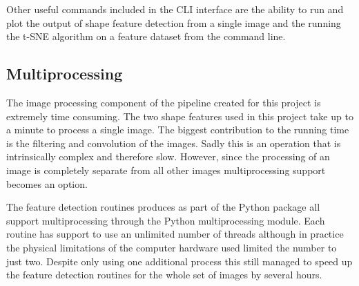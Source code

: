 Other useful commands included in the CLI interface are the ability to run and plot the output of shape feature detection from a single image and the running the t-SNE algorithm on a feature dataset from the command line.

\subsection{Multiprocessing}
The image processing component of the pipeline created for this project is extremely time consuming. The two shape features used in this project take up to a minute to process a single image. The biggest contribution to the running time is the filtering and convolution of the images. Sadly this is an operation that is intrinsically complex and therefore slow. However, since the processing of an image is completely separate from all other images multiprocessing support becomes an option. 

The feature detection routines produces as part of the Python package all support multiprocessing through the Python multiprocessing module. Each routine has support to use an unlimited number of threads although in practice the physical limitations of the computer hardware used limited the number to just two. Despite only using one additional process this still managed to speed up the feature detection routines for the whole set of images by several hours.



